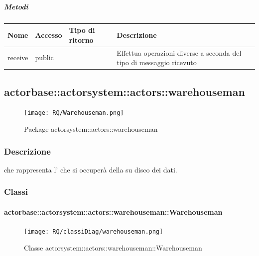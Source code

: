 \documentclass{scalatekids-article}
\begin{document}
\subparagraph{Metodi}

\begin{tabular}{| l | l | l | l |}
  \hline
  Nome & Accesso & Tipo di ritorno & Descrizione\\
  \hline
  receive & public &  & Effettua operazioni diverse a seconda del tipo di messaggio ricevuto\\
  \hline
\end{tabular}


\subsection{actorbase::actorsystem::actors::warehouseman}
\label{sec:actorbase::actorsystem::actors::warehouseman}

\begin{figure}[H]
  \begin{center}
    \texttt{[image: RQ/Warehouseman.png]}
    \caption{Package actorsystem::actors::warehouseman}
  \end{center}
\end{figure}

\subsubsection{Descrizione}

 che rappresenta l' che si occuperà della
 su disco dei dati.

\subsubsection{Classi}

\paragraph{actorbase::actorsystem::actors::warehouseman::Warehouseman}
\label{sec:actorbase::actorsystem::actors::warehouseman::Warehouseman}

\begin{figure}[H]
  \begin{center}
    \texttt{[image: RQ/classiDiag/warehouseman.png]}
    \caption{Classe actorsystem::actors::warehouseman::Warehouseman}
  \end{center}
\end{figure}
\end{document}
